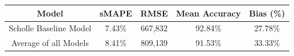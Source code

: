 \documentclass[12pt,oneside]{chicagocapstone}
\begin{document}
\begin{longtable}[]{@{}ccccc@{}}
\toprule
\begin{minipage}[b]{0.27\columnwidth}\centering\strut
Model\strut
\end{minipage} & \begin{minipage}[b]{0.13\columnwidth}\centering\strut
sMAPE\strut
\end{minipage} & \begin{minipage}[b]{0.14\columnwidth}\centering\strut
RMSE\strut
\end{minipage} & \begin{minipage}[b]{0.16\columnwidth}\centering\strut
Mean Accuracy\strut
\end{minipage} & \begin{minipage}[b]{0.16\columnwidth}\centering\strut
Bias (\%)\strut
\end{minipage}\tabularnewline
\midrule
\endhead
\begin{minipage}[t]{0.27\columnwidth}\centering\strut
Scholle Baseline Model\strut
\end{minipage} & \begin{minipage}[t]{0.13\columnwidth}\centering\strut
7.43\%\strut
\end{minipage} & \begin{minipage}[t]{0.14\columnwidth}\centering\strut
667,832\strut
\end{minipage} & \begin{minipage}[t]{0.16\columnwidth}\centering\strut
92.84\%\strut
\end{minipage} & \begin{minipage}[t]{0.16\columnwidth}\centering\strut
27.78\%\strut
\end{minipage}\tabularnewline
\begin{minipage}[t]{0.27\columnwidth}\centering\strut
Average of all Models\strut
\end{minipage} & \begin{minipage}[t]{0.13\columnwidth}\centering\strut
8.41\%\strut
\end{minipage} & \begin{minipage}[t]{0.14\columnwidth}\centering\strut
809,139\strut
\end{minipage} & \begin{minipage}[t]{0.16\columnwidth}\centering\strut
91.53\%\strut
\end{minipage} & \begin{minipage}[t]{0.16\columnwidth}\centering\strut
33.33\%\strut
\end{minipage}\tabularnewline

\end{longtable}
\end{document}
